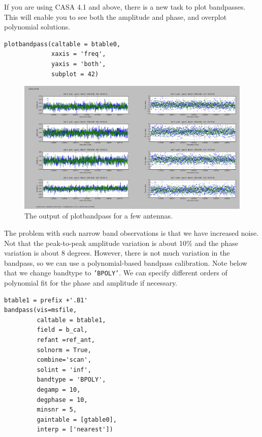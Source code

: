 \documentclass[force,almostfull,justified]{tufte-book}
\begin{document}
If you are using CASA 4.1 and above, there is a new task to plot
bandpasses. This will enable you to see both the amplitude and phase,
and overplot polynomial solutions.

\begin{casacmd}
\begin{verbatim}
plotbandpass(caltable = btable0,
             xaxis = 'freq',
             yaxis = 'both',
             subplot = 42)
\end{verbatim}
\end{casacmd}

\begin{figure}
  \includegraphics[width=\textwidth]{images/plotbandpass_b}
  \caption[]{The output of plotbandpass for a few antennas.}
  \forceversofloat
  \label{fig:plotbandpass_b}
\end{figure}

The problem with such narrow band observations is that we have increased
noise.  Not that the peak-to-peak amplitude variation is about 10\% and
the phase variation is about 8 degrees.  However, there is not much
variation in the bandpass, so we can use a polynomial-based bandpass
calibration. Note below that we change bandtype to {\tt 'BPOLY'}. We can
specify different orders of polynomial fit for the phase and amplitude
if necessary.

\begin{casacmd}
\begin{verbatim}
btable1 = prefix +'.B1'
bandpass(vis=msfile,
         caltable = btable1,
         field = b_cal,
         refant =ref_ant,
         solnorm = True,
         combine='scan',
         solint = 'inf',
         bandtype = 'BPOLY',
         degamp = 10,
         degphase = 10,
         minsnr = 5,
         gaintable = [gtable0],
         interp = ['nearest'])
\end{verbatim}
\end{casacmd}
\end{document}
